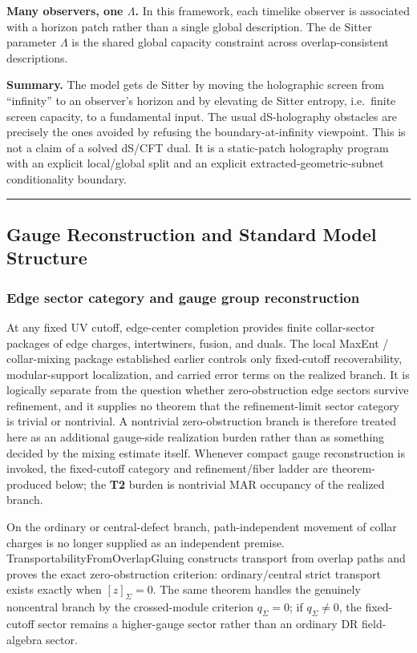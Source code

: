 \textbf{Many observers, one \(\Lambda\).} In this framework, each timelike observer is associated with a horizon patch rather than a single global description. The de Sitter parameter \(\Lambda\) is the shared global capacity constraint across overlap-consistent descriptions.

\textbf{Summary.} The model gets de Sitter by moving the holographic screen from ``infinity'' to an observer's horizon and by elevating de Sitter entropy, i.e.\ finite screen capacity, to a fundamental input. The usual dS-holography obstacles are precisely the ones avoided by refusing the boundary-at-infinity viewpoint. This is not a claim of a solved dS/CFT dual. It is a static-patch holography program with an explicit local/global split and an explicit extracted-geometric-subnet conditionality boundary.

\begin{center}\rule{0.5\linewidth}{0.5pt}\end{center}
\subsection{Gauge Reconstruction and Standard Model Structure}\label{6-gauge-reconstruction-and-standard-model-structure}

\subsubsection{Edge sector category and gauge group reconstruction}\label{61-edge-sector-category-and-gauge-group-reconstruction}

At any fixed UV cutoff, edge-center completion provides finite collar-sector packages of edge charges, intertwiners, fusion, and duals. The local MaxEnt / collar-mixing package established earlier controls only fixed-cutoff recoverability, modular-support localization, and carried error terms on the realized branch. It is logically separate from the question whether zero-obstruction edge sectors survive refinement, and it supplies no theorem that the refinement-limit sector category is trivial or nontrivial. A nontrivial zero-obstruction branch is therefore treated here as an additional gauge-side realization burden rather than as something decided by the mixing estimate itself. Whenever compact gauge reconstruction is invoked, the fixed-cutoff category and refinement/fiber ladder are theorem-produced below; the \textbf{T2} burden is nontrivial MAR occupancy of the realized branch.

On the ordinary or central-defect branch, path-independent movement of collar charges is no longer supplied as an independent premise. TransportabilityFromOverlapGluing constructs transport from overlap paths and proves the exact zero-obstruction criterion: ordinary/central strict transport exists exactly when \([z]_\Sigma=0\). The same theorem handles the genuinely noncentral branch by the crossed-module criterion \(q_\Sigma=0\); if \(q_\Sigma\ne0\), the fixed-cutoff sector remains a higher-gauge sector rather than an ordinary DR field-algebra sector.

